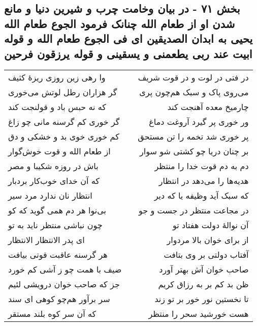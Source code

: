 \begin{center}
\section*{بخش ۷۱ - در بیان وخامت چرب و شیرین دنیا و مانع شدن او از طعام الله چنانک فرمود الجوع طعام الله یحیی به ابدان الصدیقین ای فی الجوع طعام الله و قوله ابیت عند ربی یطعمنی و یسقینی و قوله  یرزقون فرحین}
\label{sec:sh071}
\begin{longtable}{l p{0.5cm} r}
وا رهی زین روزی ریزهٔ کثیف
&&
در فتی در لوت و در قوت شریف
\\
گر هزاران رطل لوتش می‌خوری
&&
می‌روی پاک و سبک هم‌چون پری
\\
که نه حبس باد و قولنجت کند
&&
چارمیخ معده آهنجت کند
\\
گر خوری کم گرسنه مانی چو زاغ
&&
ور خوری پر گیرد آروغت دماغ
\\
کم خوری خوی بد و خشکی و دق
&&
پر خوری شد تخمه را تن مستحق
\\
از طعام الله و قوت خوش‌گوار
&&
بر چنان دریا چو کشتی شو سوار
\\
باش در روزه شکیبا و مصر
&&
دم به دم قوت خدا را منتظر
\\
که آن خدای خوب‌کار بردبار
&&
هدیه‌ها را می‌دهد در انتظار
\\
انتظار نان ندارد مرد سیر
&&
که سبک آید وظیفه یا که دیر
\\
بی‌نوا هر دم همی گوید که کو
&&
در مجاعت منتظر در جست و جو
\\
چون نباشی منتظر ناید به تو
&&
آن نوالهٔ دولت هفتاد تو
\\
ای پدر الانتظار الانتظار
&&
از برای خوان بالا مردوار
\\
هر گرسنه عاقبت قوتی بیافت
&&
آفتاب دولتی بر وی بتافت
\\
ضیف با همت چو ز آشی کم خورد
&&
صاحب خوان آش بهتر آورد
\\
جز که صاحب خوان درویشی لئیم
&&
ظن بد کم بر به رزاق کریم
\\
سر برآور هم‌چو کوهی ای سند
&&
تا نخستین نور خور بر تو زند
\\
که آن سر کوه بلند مستقر
&&
هست خورشید سحر را منتظر
\\
\end{longtable}
\end{center}

